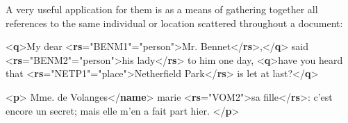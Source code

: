 A very useful application for them is as a means of gathering together all references to the same individual or location scattered throughout a document: \par\bgroup{}\exampleFont \begin{shaded}\noindent\mbox{}{<\textbf{q}>}My dear\mbox{}\newline 
{<\textbf{rs}\hspace*{1em}{key}="{BENM1}"\hspace*{1em}{type}="{person}">}Mr. Bennet{</\textbf{rs}>},{</\textbf{q}>} said\mbox{}\newline 
{<\textbf{rs}\hspace*{1em}{key}="{BENM2}"\hspace*{1em}{type}="{person}">}his lady{</\textbf{rs}>} to him one day,\mbox{}\newline 
\mbox{}\newline 
{<\textbf{q}>}have you heard that\mbox{}\newline 
{<\textbf{rs}\hspace*{1em}{key}="{NETP1}"\hspace*{1em}{type}="{place}">}Netherfield Park{</\textbf{rs}>} is let at\mbox{}\newline 
 last?{</\textbf{q}>}\end{shaded}\egroup\par \noindent  \par\bgroup{}\exampleFont \begin{shaded}\noindent\mbox{}{<\textbf{p}>}\mbox{}\newline 
{}Mme. de Volanges{</\textbf{name}>} \mbox{}\newline 
 marie {<\textbf{rs}\hspace*{1em}{key}="{VOM2}">}sa fille{</\textbf{rs}>}:\mbox{}\newline 
 c'est encore un secret;\mbox{}\newline 
 mais elle m'en a fait part hier.\mbox{}\newline 
{</\textbf{p}>}\end{shaded}\egroup\par \par
